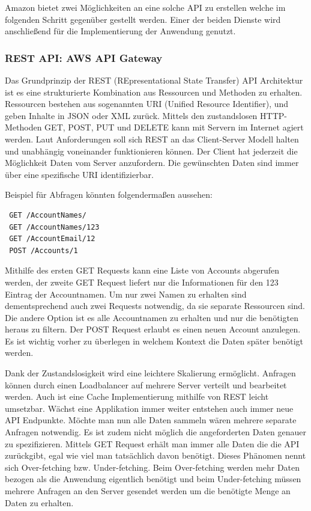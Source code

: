 Amazon bietet zwei Möglichkeiten an eine solche API zu erstellen welche im folgenden Schritt gegenüber gestellt werden.
Einer der beiden Dienste wird anschließend für die Implementierung der Anwendung genutzt.


\subsubsection{REST API: AWS API Gateway}
Das Grundprinzip der REST (REpresentational State Transfer) API Architektur ist es eine strukturierte Kombination aus Ressourcen und Methoden zu erhalten.
Ressourcen bestehen aus sogenannten URI (Unified Resource Identifier), und geben Inhalte in JSON oder XML zurück.
Mittels den zustandslosen HTTP-Methoden GET, POST, PUT und DELETE kann mit Servern im Internet agiert werden.
Laut Anforderungen soll sich REST an das Client-Server Modell halten und unabhängig voneinander funktionieren können.
Der Client hat jederzeit die Möglichkeit Daten vom Server anzufordern.
Die gewünschten Daten sind immer über eine spezifische URI identifizierbar.

Beispiel für Abfragen könnten folgendermaßen aussehen:
\begin{lstlisting}
 GET /AccountNames/
 GET /AccountNames/123
 GET /AccountEmail/12
 POST /Accounts/1
\end{lstlisting}

Mithilfe des ersten GET Requests kann eine Liste von Accounts abgerufen werden, der zweite GET Request liefert nur die Informationen für den 123 Eintrag der Accountnamen.
Um nur zwei Namen zu erhalten sind dementsprechend auch zwei Requests notwendig, da sie separate Ressourcen sind.
Die andere Option ist es alle Accountnamen zu erhalten und nur die benötigten heraus zu filtern.
Der POST Request erlaubt es einen neuen Account anzulegen.
Es ist wichtig vorher zu überlegen in welchem Kontext die Daten später benötigt werden.

Dank der Zustandslosigkeit wird eine leichtere Skalierung ermöglicht. Anfragen können durch einen Loadbalancer auf mehrere Server verteilt und bearbeitet werden.
Auch ist eine Cache Implementierung mithilfe von REST leicht
umsetzbar. Wächst eine Applikation immer weiter entstehen auch immer neue API Endpunkte. Möchte man nun alle Daten sammeln wären mehrere separate
Anfragen notwendig. Es ist zudem nicht möglich die angeforderten Daten genauer zu spezifizieren. Mittels GET Request erhält man immer alle Daten die
die API zurückgibt, egal wie viel man tatsächlich davon benötigt. Dieses Phänomen nennt sich Over-fetching bzw. Under-fetching.
Beim Over-fetching werden mehr Daten bezogen als die Anwendung eigentlich benötigt und beim Under-fetching müssen mehrere Anfragen an den Server
gesendet werden um die benötigte Menge an Daten zu erhalten.\cite[]{API}


